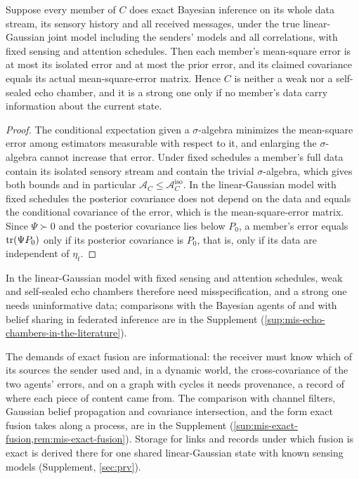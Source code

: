 \begin{proposition}\label{prop:mis-exact-no-echo}
Suppose every member of $C$ does exact Bayesian inference on its whole data stream, its sensory history and all received messages, under the true linear-Gaussian joint model including the senders' models and all correlations, with fixed sensing and attention schedules. Then each member's mean-square error is at most its isolated error and at most the prior error, and its claimed covariance equals its actual mean-square-error matrix. Hence $C$ is neither a weak nor a self-sealed echo chamber, and it is a strong one only if no member's data carry information about the current state.
\end{proposition}
\begin{proof}
The conditional expectation given a $\sigma$-algebra minimizes the mean-square error among estimators measurable with respect to it, and enlarging the $\sigma$-algebra cannot increase that error. Under fixed schedules a member's full data contain its isolated sensory stream and contain the trivial $\sigma$-algebra, which gives both bounds and in particular $\mathcal A_C\le\mathcal A^{\mathrm{iso}}_C$. In the linear-Gaussian model with fixed schedules the posterior covariance does not depend on the data and equals the conditional covariance of the error, which is the mean-square-error matrix. Since $\Psi\succ0$ and the posterior covariance lies below $P_0$, a member's error equals $\operatorname{tr}(\Psi P_0)$ only if its posterior covariance is $P_0$, that is, only if its data are independent of $\eta_t$.
\end{proof}

In the linear-Gaussian model with fixed sensing and attention schedules, weak and self-sealed echo chambers therefore need misspecification, and a strong one needs uninformative data; comparisons with the Bayesian agents of \citet{madsen2018large} and with belief sharing in federated inference are in the Supplement (\cref{sup:mis-echo-chambers-in-the-literature}).

The demands of exact fusion are informational: the receiver must know which of its sources the sender used and, in a dynamic world, the cross-covariance of the two agents' errors, and on a graph with cycles it needs provenance, a record of where each piece of content came from. The comparison with channel filters, Gaussian belief propagation and covariance intersection, and the form exact fusion takes along a process, are in the Supplement (\cref{sup:mis-exact-fusion,rem:mis-exact-fusion}). Storage for links and records under which fusion is exact is derived there for one shared linear-Gaussian state with known sensing models (Supplement, \cref{sec:prv}).

